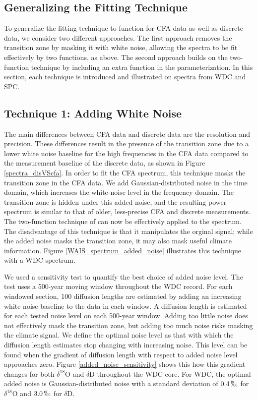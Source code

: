 \documentclass[draft, jgrga]{AGUTeX}
\begin{document}
\begin{article}
\section{Generalizing the Fitting Technique}
To generalize the fitting technique to function for CFA data as well as discrete data, we consider two different approaches. The first approach removes the transition zone by masking it with white noise, allowing the spectra to be fit effectively by two functions, as above. The second approach builds on the two-function technique by including an extra function in the parameterization. In this section, each technique is introduced and illustrated on spectra from WDC and SPC.

\subsection{Technique 1: Adding White Noise}
The main differences between CFA data and discrete data are the resolution and precision. These differences result in the presence of the transition zone due to a lower white noise baseline for the high frequencies in the CFA data compared to the measurement baseline of the discrete data, as shown in Figure \ref{spectra_disVScfa}. In order to fit the CFA spectrum, this technique masks the transition zone in the CFA data. We add Gaussian-distributed noise in the time domain, which increases the white-noise level in the frequency domain. The transition zone is hidden under this added noise, and the resulting power spectrum is similar to that of older, less-precise CFA and discrete measurements. The two-function technique of \citet{Gkinis2014} can now be effectively applied to the spectrum. The disadvantage of this technique is that it manipulates the orginal signal; while the added noise masks the transition zone, it may also mask useful climate information. Figure \ref{WAIS_spectrum_added_noise} illustrates this technique with a WDC spectrum.

We used a sensitivity test to quantify the best choice of added noise level. The test uses a 500-year moving window throughout the WDC record. For each windowed section, 100 diffusion lengths are estimated by adding an increasing white noise baseline to the data in each window. A diffusion length is estimated for each tested noise level on each 500-year window. Adding too little noise does not effectively mask the transition zone, but adding too much noise risks masking the climate signal. We define the optimal noise level as that with which the diffusion length estimates stop changing with increasing noise. This level can be found when the gradient of diffusion length with respect to added noise level approaches zero. Figure \ref{added_noise_sensitivity} shows this how this gradient changes for both $\delta^{18}$O and $\delta$D throughout the WDC core. For WDC, the optimal added noise is Gaussian-distributed noise with a standard deviation of $0.4 \, \permil$ for $\delta^{18}$O and $3.0 \,\permil$ for $\delta$D.


\end{article}
\end{document}
